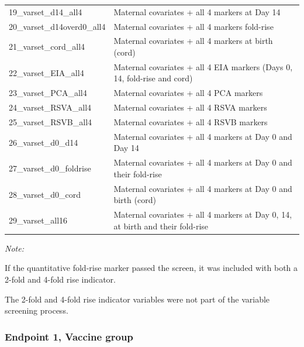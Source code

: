 \documentclass[11pt]{article}
\begin{document}
\begin{table}[!h]
\begin{threeparttable}
\begin{tabular}[t]{l>{\raggedright\arraybackslash}p{15cm}}
19\_varset\_d14\_all4 & Maternal covariates + all 4 markers at Day 14\\
20\_varset\_d14overd0\_all4 & Maternal covariates + all 4 markers fold-rise\\
21\_varset\_cord\_all4 & Maternal covariates + all 4 markers at birth (cord)\\
22\_varset\_EIA\_all4 & Maternal covariates + all 4 EIA markers (Days 0, 14, fold-rise and cord)\\
23\_varset\_PCA\_all4 & Maternal covariates + all 4 PCA markers\\
24\_varset\_RSVA\_all4 & Maternal covariates + all 4 RSVA markers\\
25\_varset\_RSVB\_all4 & Maternal covariates + all 4 RSVB markers\\
26\_varset\_d0\_d14 & Maternal covariates + all 4 markers at Day 0 and Day 14\\
27\_varset\_d0\_foldrise & Maternal covariates + all 4 markers at Day 0 and their fold-rise\\
28\_varset\_d0\_cord & Maternal covariates + all 4 markers at Day 0 and birth (cord)\\
29\_varset\_all16 & Maternal covariates + all 4 markers at Day 0, 14, at birth and their fold-rise\\
\bottomrule
\end{tabular}
\begin{tablenotes}
\item \textit{Note: } 
\item If the quantitative fold-rise marker passed the screen, it was included with both a 2-fold and 4-fold rise indicator.
\item The 2-fold and 4-fold rise indicator variables were not part of the variable screening process.
\end{tablenotes}
\end{threeparttable}
\end{table}

\clearpage

\hypertarget{endpoint-1-vaccine-group}{%
\subsubsection{Endpoint 1, Vaccine group}\label{endpoint-1-vaccine-group}}
\end{document}

